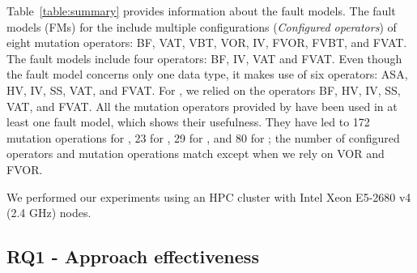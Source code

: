 {Table~\ref{table:summary} provides information about the fault models.}
The fault models (FMs) for the \ADCS include multiple configurations (\emph{Configured operators}) of eight mutation operators: BF, VAT, VBT, VOR, IV, FVOR, FVBT, and FVAT.
The \PDHU fault models include four operators: BF, IV, VAT and FVAT.
Even though the \GPS fault model concerns only one data type, it makes use of six operators: ASA, HV, IV, SS, VAT, and FVAT.
For \PARAM, we relied on the operators BF, HV, IV, SS, VAT, and FVAT.
All the mutation operators provided by \APPR have been used in at least one fault model, which shows their usefulness.
{They have led to 172 mutation operations for \ADCS, 23 for \GPS, 29 for \PDHU, and 80 for \PARAM; the number of configured operators and mutation operations match except when we rely on VOR and FVOR.}



We performed our experiments using an HPC cluster with Intel Xeon E5-2680 v4 (2.4 GHz) nodes.



\subsection{RQ1 - Approach effectiveness}


